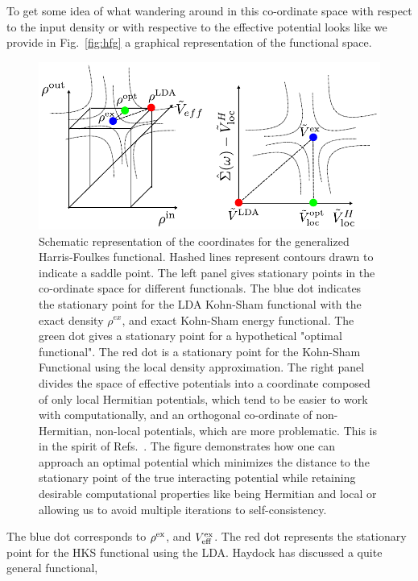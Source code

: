 To get some idea of what wandering around in this co-ordinate space
with respect to the input density or with respective to the effective potential looks like
we provide in Fig.~\ref{fig:hfg} a graphical representation of the functional space.
%
\begin{figure}
\begin{center}
\includegraphics{./GW/HFG_space.pdf}
\caption{Schematic representation of the coordinates for the generalized
Harris-Foulkes functional. Hashed lines represent contours drawn to indicate
a saddle point. The left panel gives stationary points in the co-ordinate space
for different functionals. The blue dot indicates the stationary point for the
LDA Kohn-Sham functional with the exact density $\rho^{ex}$, 
and exact Kohn-Sham energy functional. The green dot gives a stationary point
for a hypothetical "optimal functional". The red dot is a stationary point
for the Kohn-Sham Functional using the local density approximation. 
The right panel divides the space of effective potentials into a coordinate 
composed of only local Hermitian potentials, which tend 
to be easier to work with computationally, and an orthogonal co-ordinate 
of non-Hermitian, non-local potentials, which are more problematic. 
This is in the spirit of Refs.~\cite{sohrab10, patrick12, sohrab17}. 
The figure demonstrates how one can approach an optimal
potential which minimizes the distance to the stationary point of the true interacting potential
while retaining desirable computational properties like being Hermitian and local
or allowing us to avoid multiple iterations to self-consistency.\label{hfg}}
\end{center}
\end{figure}
%
The blue dot corresponds to $\rho^{\rm ex}$, and $V^{\rm ex}_{\rm eff}$. The red dot
represents the stationary point for the HKS functional using the LDA.
Haydock \cite{haydock97} has discussed a quite general functional,
